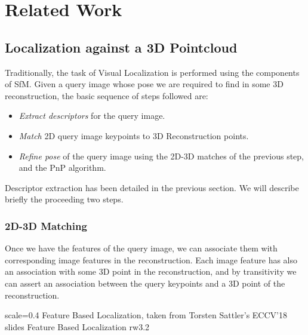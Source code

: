 

\chapter{Related Work}
\section{Localization against a 3D Pointcloud}
Traditionally, the task of Visual Localization is performed using the components of SfM. Given a query image whose pose we are required to find in some 3D reconstruction, the basic sequence of steps followed are:

\begin{itemize}
	\item \emph{Extract descriptors} for the query image.\\
	\item \textit{Match} 2D query image keypoints to 3D Reconstruction points.\\
	\item \textit{Refine pose} of the query image using the 2D-3D matches of the previous step, and the PnP algorithm.\\
\end{itemize}

Descriptor extraction has been detailed in the previous section. We will describe briefly the proceeding two steps. 

\subsection{2D-3D Matching}
Once we have the features of the query image, we can associate them with corresponding image features in the reconstruction. Each image feature has also an association with some 3D point in the reconstruction, and by transitivity we can assert an association between the query keypoints and a 3D point of the reconstruction.

{scale=0.4}%
{Feature Based Localization, taken from Torsten Sattler's ECCV'18 slides}%
{Feature Based Localization}%
{rw3.2} %

